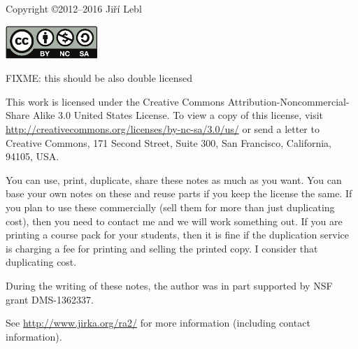 \documentclass[12pt]{book}
\theoremstyle{plain}
\theoremstyle{remark}
\theoremstyle{definition}
\theoremstyle{exercise}
\theoremstyle{example}
\begin{document}
\bigskip

\noindent
Copyright \copyright 2012--2016 Ji{\v r}\'i Lebl

\bigskip

\noindent
\includegraphics[width=1.38in]{../figures/license}

\bigskip

FIXME: this should be also double licensed

\noindent
This work is licensed under the Creative Commons
Attribution-Non\-commercial-Share Alike 3.0 United States License. To view a
copy of this license, visit
\url{http://creativecommons.org/licenses/by-nc-sa/3.0/us/} or send a letter to
Creative Commons, 171 Second Street, Suite 300, San Francisco, California,
94105, USA.

\bigskip

\noindent
You can use, print, duplicate, share these notes as much as you want.  You can
base your own notes on these and reuse parts if you keep the license the
same.  If you plan to use these commercially (sell them for more than just
duplicating cost), then you need to contact me and we will work something out.
If you are printing a course pack for your students, then it is fine if the 
duplication service is charging a fee for printing and selling the printed
copy.  I consider that duplicating cost.

\bigskip

\noindent
During the writing of these notes, 
the author was in part supported by NSF grant DMS-1362337.

\bigskip

\noindent
See \url{http://www.jirka.org/ra2/} for more information
(including contact information).



\tableofcontents
{}

\newpage

\end{document}
